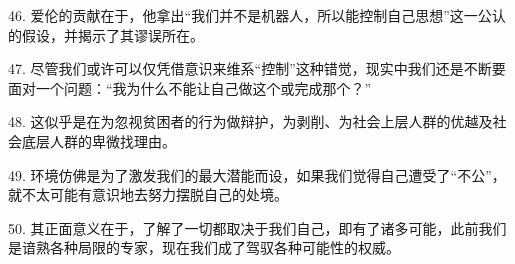 46. 爱伦的贡献在于，他拿出“我们并不是机器人，所以能控制自己思想”这一公认的假设，并揭示了其谬误所在。

47. 尽管我们或许可以仅凭借意识来维系“控制”这种错觉，现实中我们还是不断要面对一个问题：“我为什么不能让自己做这个或完成那个？”

48. 这似乎是在为忽视贫困者的行为做辩护，为剥削、为社会上层人群的优越及社会底层人群的卑微找理由。

49. 环境仿佛是为了激发我们的最大潜能而设，如果我们觉得自己遭受了“不公”，就不太可能有意识地去努力摆脱自己的处境。

50. 其正面意义在于，了解了一切都取决于我们自己，即有了诸多可能，此前我们是谙熟各种局限的专家，现在我们成了驾驭各种可能性的权威。